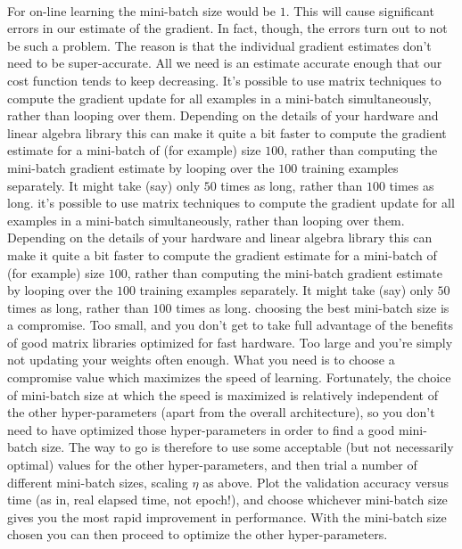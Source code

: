 \paragraph{} For on-line learning the mini-batch size would be $1$. This will cause significant errors in our estimate of the gradient. In fact, though, the errors turn out to not be such a problem. The reason is that the individual gradient estimates don't need to be super-accurate. All we need is an estimate accurate enough that our cost function tends to keep decreasing. It's possible to use matrix techniques to compute the gradient update for all examples in a mini-batch simultaneously, rather than looping over them. Depending on the details of your hardware and linear algebra library this can make it quite a bit faster to compute the gradient estimate for a mini-batch of (for example) size $100$, rather than computing the mini-batch gradient estimate by looping over the $100$ training examples separately. It might take (say) only $50$
 times as long, rather than $100$ times as long.  it's possible to use matrix techniques to compute the gradient update for all examples in a mini-batch simultaneously, rather than looping over them. Depending on the details of your hardware and linear algebra library this can make it quite a bit faster to compute the gradient estimate for a mini-batch of (for example) size $100$, rather than computing the mini-batch gradient estimate by looping over the $100$ training examples separately. It might take (say) only $50$ times as long, rather than $100$ times as long. choosing the best mini-batch size is a compromise. Too small, and you don't get to take full advantage of the benefits of good matrix libraries optimized for fast hardware. Too large and you're simply not updating your weights often enough. What you need is to choose a compromise value which maximizes the speed of learning. Fortunately, the choice of mini-batch size at which the speed is maximized is relatively independent of the other hyper-parameters (apart from the overall architecture), so you don't need to have optimized those hyper-parameters in order to find a good mini-batch size. The way to go is therefore to use some acceptable (but not necessarily optimal) values for the other hyper-parameters, and then trial a number of different mini-batch sizes, scaling $\eta$ as above. Plot the validation accuracy versus time (as in, real elapsed time, not epoch!), and choose whichever mini-batch size gives you the most rapid improvement in performance. With the mini-batch size chosen you can then proceed to optimize the other hyper-parameters.

